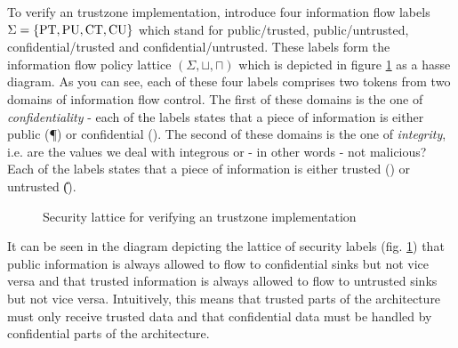 \begin{example}
    To verify an \gls{trustzone} implementation, \citeauthor{Ferraiuolo17} introduce four information flow labels $ \Sigma = \{ \text{PT}, \text{PU}, \text{CT}, \text{CU} \} $ which stand for public/trusted, public/untrusted, confidential/trusted and confidential/untrusted.
    These labels form the information flow policy lattice $ (\Sigma, \sqcup, \sqcap) $ which is depicted in figure \ref{fig:sec-lattice} as a hasse diagram.
    As you can see, each of these four labels comprises two tokens from two domains of information flow control.
    The first of these domains is the one of \textit{confidentiality} - each of the labels states that a piece of information is either public (\P{}) or confidential (\C{}).
    The second of these domains is the one of \textit{integrity}, i.e. are the values we deal with integrous or - in other words - not malicious?
    Each of the labels states that a piece of information is either trusted (\T{}) or untrusted (\U{}).

    \begin{figure}
        \centering
        \caption{Security lattice for verifying an \gls{trustzone} implementation \cite{Ferraiuolo17}}
        \label{fig:sec-lattice}
    \end{figure}

    It can be seen in the diagram depicting the lattice of security labels (fig. \ref{fig:sec-lattice}) that public information is always allowed to flow to confidential sinks but not vice versa and that trusted information is always allowed to flow to untrusted sinks but not vice versa.
    Intuitively, this means that trusted parts of the architecture must only receive trusted data and that confidential data must be handled by confidential parts of the architecture.
\end{example}

